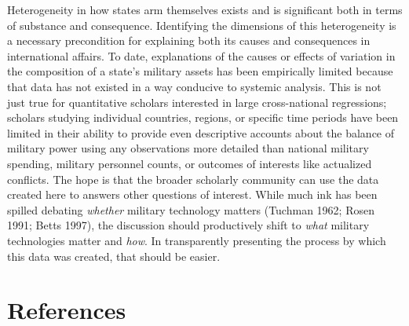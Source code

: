 \documentclass[
]{article}
\begin{document}
Heterogeneity in how states arm themselves exists and is significant both in terms of substance and consequence. Identifying the dimensions of this heterogeneity is a necessary precondition for explaining both its causes and consequences in international affairs. To date, explanations of the causes or effects of variation in the composition of a state's military assets has been empirically limited because that data has not existed in a way conducive to systemic analysis. This is not just true for quantitative scholars interested in large cross-national regressions; scholars studying individual countries, regions, or specific time periods have been limited in their ability to provide even descriptive accounts about the balance of military power using any observations more detailed than national military spending, military personnel counts, or outcomes of interests like actualized conflicts. The hope is that the broader scholarly community can use the data created here to answers other questions of interest. While much ink has been spilled debating \textit{whether} military technology matters (Tuchman 1962; Rosen 1991; Betts 1997), the discussion should productively shift to \textit{what} military technologies matter and \textit{how}. In transparently presenting the process by which this data was created, that should be easier.

\newpage

\hypertarget{references}{%
\section*{References}\label{references}}
\end{document}
